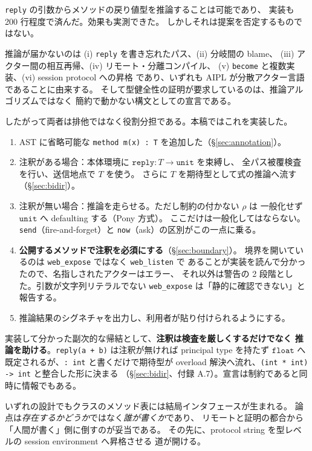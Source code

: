 \documentclass[11pt,a4paper]{ltjsarticle}
\theoremstyle{definition}
\theoremstyle{remark}
\newcommand{\ty}[1]{\ensuremath{\mathtt{#1}}}
\begin{document}
\texttt{reply} の引数からメソッドの戻り値型を推論することは可能であり、
実装も 200 行程度で済んだ。効果も実測できた。
しかしそれは提案を否定するものではない。

推論が届かないのは
(i) \texttt{reply} を書き忘れたパス、(ii) 分岐間の blame、
(iii) アクター間の相互再帰、(iv) リモート・分離コンパイル、
(v) \texttt{become} と複数実装、(vi) session protocol への昇格
であり、いずれも AIPL が分散アクター言語であることに由来する。
そして型健全性の証明が要求しているのは、推論アルゴリズムではなく
簡約で動かない構文としての宣言である。

したがって両者は排他ではなく役割分担である。本稿ではこれを実装した。

\begin{enumerate}
\item[(済)] AST に省略可能な \texttt{method m(x) : T} を追加した（\S\ref{sec:annotation}）。
\item[(済)] 注釈がある場合：本体環境に $\texttt{reply} : T \to \ty{unit}$ を束縛し、
  全パス被覆検査を行い、送信地点で $T$ を使う。
  さらに $T$ を期待型として式の推論へ流す（\S\ref{sec:bidir}）。
\item[(済)] 注釈が無い場合：推論を走らせる。ただし制約の付かない $\rho$ は
  一般化せず \ty{unit} へ defaulting する（Pony 方式）。
  ここだけは一般化してはならない。\texttt{send}（fire-and-forget）と
  \texttt{now}（ask）の区別がこの一点に乗る。
\item[(済)] \textbf{公開するメソッドで注釈を必須にする}（\S\ref{sec:boundary}）。
  境界を開いているのは \texttt{web\_expose} ではなく \texttt{web\_listen} で
  あることが実装を読んで分かったので、名指しされたアクターはエラー、
  それ以外は警告の 2 段階とした。引数が文字列リテラルでない
  \texttt{web\_expose} は「静的に確認できない」と報告する。
\item[(未)] 推論結果のシグネチャを出力し、利用者が貼り付けられるようにする。
\end{enumerate}

実装して分かった副次的な帰結として、\textbf{注釈は検査を厳しくするだけでなく
推論を助ける}。\texttt{reply(a + b)} は注釈が無ければ principal type を持たず
\ty{float} へ既定されるが、\texttt{: int} と書くだけで期待型が
overload 解決へ流れ、\texttt{(int * int) -> int} と整合した形に決まる
（\S\ref{sec:bidir}、付録 A.7）。宣言は制約であると同時に情報でもある。

いずれの設計でもクラスのメソッド表には結局インタフェースが生まれる。
論点は\emph{存在するかどうか}ではなく\emph{誰が書くか}であり、
リモートと証明の都合から「人間が書く」側に倒すのが妥当である。
その先に、protocol string を型レベルの session environment へ昇格させる
道が開ける。
\end{document}
